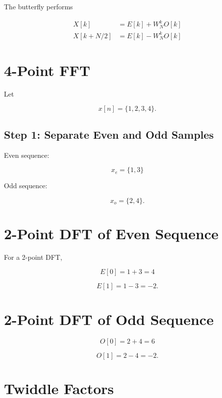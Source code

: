The butterfly performs

\[
\boxed{
\begin{aligned}
X[k] &= E[k]+W_N^kO[k]\\
X[k+N/2] &= E[k]-W_N^kO[k]
\end{aligned}
}
\]


\section{4-Point FFT}

Let

\[
x[n]=\{1,2,3,4\}.
\]


\subsection{Step 1: Separate Even and Odd Samples}

Even sequence:

\[
x_e=\{1,3\}
\]

Odd sequence:

\[
x_o=\{2,4\}.
\]


\section{2-Point DFT of Even Sequence}

For a 2-point DFT,

\[
E[0]=1+3=4
\]

\[
E[1]=1-3=-2.
\]


\section{2-Point DFT of Odd Sequence}

\[
O[0]=2+4=6
\]

\[
O[1]=2-4=-2.
\]


\section{Twiddle Factors}

